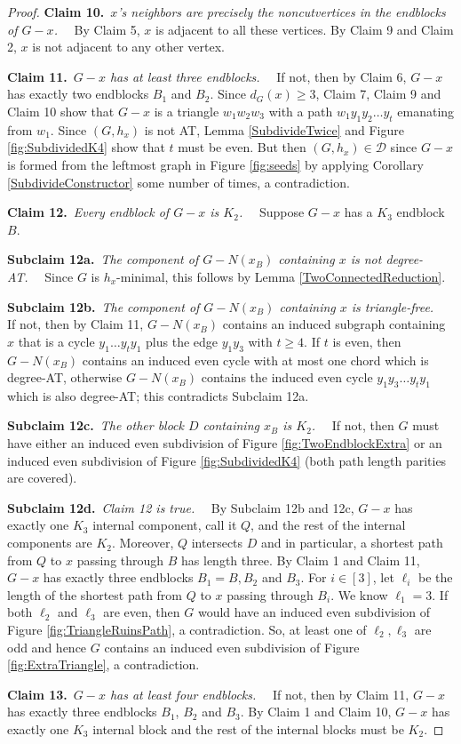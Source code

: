 \documentclass[12pt]{article}
\theoremstyle{plain}
\theoremstyle{definition}
\theoremstyle{remark}
\newcommand{\fancy}[1]{\mathcal{#1}}
\newcommand{\D}{\fancy{D}}
\newcommand{\irange}[1]{\left[#1\right]}
\def\D{\fancy{D}}
\newcommand{\claim}[2]{{\bf Claim #1.}~{\it #2}~~}
\newcommand{\subclaim}[2]{{\bf Subclaim #1.}~{\it #2}~~}
\begin{document}
\begin{proof}
	 \claim{10}{$x$'s neighbors are precisely the noncutvertices in the endblocks of $G-x$.}
	 By Claim 5, $x$ is adjacent to all these vertices.  By Claim 9 and Claim 2, $x$ is not adjacent to any other vertex.
	 
	 \claim{11}{$G-x$ has at least three endblocks.}
	 If not, then by Claim 6, $G-x$ has exactly two endblocks $B_1$ and $B_2$.  Since $d_G(x) \ge 3$, Claim 7, Claim 9 and Claim 10 show that $G-x$ is a triangle $w_1w_2w_3$ with a path $w_1y_1y_2\ldots y_t$ emanating from $w_1$.  Since $(G,h_x)$ is not AT, Lemma \ref{SubdivideTwice} and Figure \ref{fig:SubdividedK4} show that $t$ must be even.  But then $(G, h_x) \in \D$ since $G-x$ is formed from the leftmost graph in Figure \ref{fig:seeds} by applying Corollary \ref{SubdivideConstructor} some number of times, a contradiction.

	 \claim{12}{Every endblock of $G-x$ is $K_2$.}
	 Suppose $G-x$ has a $K_3$ endblock $B$.  
	 
	 \subclaim{12a}{The component of $G-N(x_B)$ containing $x$ is not degree-AT.}
	 Since $G$ is $h_x$-minimal, this follows by Lemma \ref{TwoConnectedReduction}.
	 
	 \subclaim{12b}{The component of $G-N(x_B)$ containing $x$ is triangle-free.}
	 If not, then by Claim 11, $G-N(x_B)$ contains an induced subgraph containing $x$ that is a cycle $y_1\ldots y_ty_1$ plus the edge $y_1y_3$ with $t \ge 4$.  If $t$ is even, then $G-N(x_B)$ contains an induced even cycle with at most one chord which is degree-AT, otherwise $G-N(x_B)$ contains the induced even cycle $y_1y_3\ldots y_ty_1$ which is also degree-AT; this contradicts Subclaim 12a.
	 
	 \subclaim{12c}{The other block $D$ containing $x_B$ is $K_2$.}
	 If not, then $G$ must have either an induced even subdivision of Figure \ref{fig:TwoEndblockExtra} or an induced even subdivision of Figure \ref{fig:SubdividedK4} (both path length parities are covered).
	 
	 \subclaim{12d}{Claim 12 is true.}
	 By Subclaim 12b and 12c, $G-x$ has exactly one $K_3$ internal component, call it $Q$, and the rest of the internal components are $K_2$.  Moreover, $Q$ intersects $D$ and in particular, a shortest path from $Q$ to $x$ passing through $B$ has length three. By Claim 1 and Claim 11, $G-x$ has exactly three endblocks $B_1 = B, B_2$ and $B_3$.  For $i \in \irange{3}$, let $\ell_i$ be the length of the shortest path from $Q$ to $x$ passing through $B_i$.  We know $\ell_1 = 3$.  If both $\ell_2$ and $\ell_3$ are  even, then $G$ would have an induced even subdivision of Figure \ref{fig:TriangleRuinsPath}, a contradiction.   So, at least one of $\ell_2, \ell_3$ are odd and hence $G$ contains an induced even subdivision of Figure \ref{fig:ExtraTriangle}, a contradiction. 
	 
	 \claim{13}{$G-x$ has at least four endblocks.}
	  If not, then by Claim 11, $G-x$ has exactly three endblocks $B_1$, $B_2$ and $B_3$.  By Claim 1 and Claim 10, $G-x$ has exactly one $K_3$ internal block and the rest of the internal blocks must be $K_2$.

\end{proof}



\end{document}
